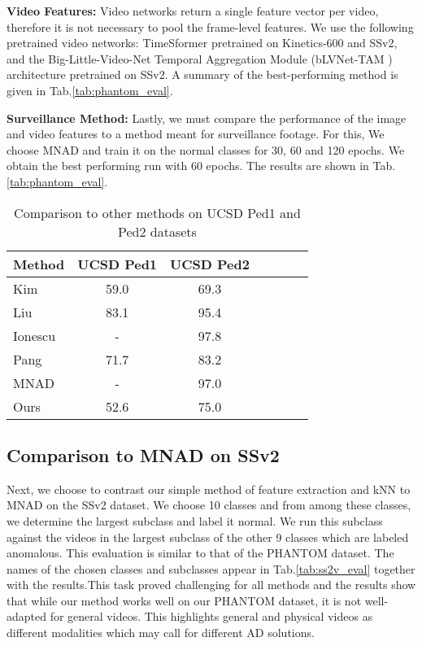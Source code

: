 \documentclass{article}
\begin{document}
\textbf{Video Features: }Video networks return a single feature vector per video, therefore it is not necessary to pool the frame-level features. We use the following pretrained video networks: TimeSformer \cite{bertasius2021space} pretrained on Kinetics-600 \cite{carreira2018short} and SSv2, and the Big-Little-Video-Net Temporal Aggregation Module (bLVNet-TAM \cite{fan2019more}) architecture pretrained on SSv2. A summary of the best-performing method is given in Tab.\ref{tab:phantom_eval}. 

\textbf{Surveillance Method: } Lastly, we must compare the performance of the image and video features to a method meant for surveillance footage. For this, We choose MNAD and train it on the normal classes for 30, 60 and 120 epochs. We obtain the best performing run with 60 epochs. The results are shown in Tab.\ref{tab:phantom_eval}.

\begin{table}[t!]
  \centering

    \begin{tabular}{lcccccc}
    \toprule      
	Method	&	UCSD Ped1	&	UCSD Ped2	\\
\midrule						

	Kim\cite{kim2009observe}	&	59.0	&	69.3	\\
	Liu\cite{liu2018future}	&	83.1	&	95.4	\\

	Ionescu\cite{ionescu2019object}	&	-	&	97.8	\\
			Pang\cite{pang2020self}	&	71.7	&	83.2	\\
		MNAD\cite{park2020learning}	&	-	&	97.0	\\
	Ours	&	52.6	&	75.0	\\
	 \bottomrule
    \end{tabular}
    \caption{Comparison to other methods on UCSD Ped1 and Ped2 datasets}
      \label{tab:ucsd_eval}

\end{table}

\subsection{Comparison to MNAD on SSv2}
\label{sec:exp_general}

Next, we choose to contrast our simple method of feature extraction and kNN to MNAD on the SSv2 dataset. We choose 10 classes and from among these classes, we determine the largest subclass and label it normal. We run this subclass against the videos in the largest subclass of the other 9 classes which are labeled anomalous. This evaluation is similar to that of the PHANTOM dataset. The names of the chosen classes and subclasses appear in Tab.\ref{tab:ss2v_eval} together with the results.This task proved challenging for all methods and the results show that while our method works well on our PHANTOM dataset, it is not well-adapted for general videos. This highlights general and physical videos as different modalities which may call for different AD solutions.
\end{document}
